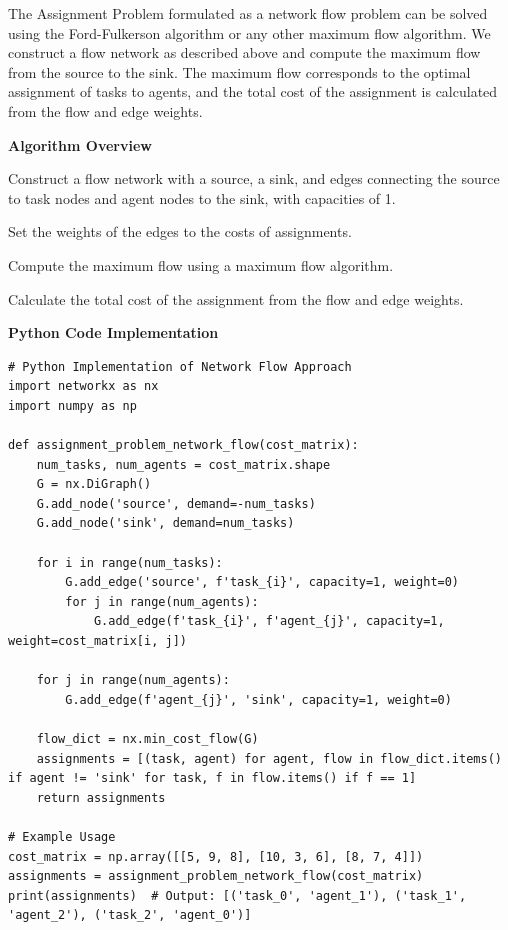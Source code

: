 \documentclass[12pt]{book} %
\begin{document}
The Assignment Problem formulated as a network flow problem can be solved using the Ford-Fulkerson algorithm or any other maximum flow algorithm. We construct a flow network as described above and compute the maximum flow from the source to the sink. The maximum flow corresponds to the optimal assignment of tasks to agents, and the total cost of the assignment is calculated from the flow and edge weights.

\textbf{Algorithm Overview}
\FloatBarrier
\begin{algorithm}
\caption{Assignment Problem - Network Flow Approach}
\begin{algorithmic}[1]
\item Construct a flow network with a source, a sink, and edges connecting the source to task nodes and agent nodes to the sink, with capacities of 1.
  \item Set the weights of the edges to the costs of assignments.
  \item Compute the maximum flow using a maximum flow algorithm.
  \item Calculate the total cost of the assignment from the flow and edge weights.
\end{algorithmic}
\end{algorithm}
\FloatBarrier
\textbf{Python Code Implementation}
\begin{lstlisting}
# Python Implementation of Network Flow Approach
import networkx as nx
import numpy as np

def assignment_problem_network_flow(cost_matrix):
    num_tasks, num_agents = cost_matrix.shape
    G = nx.DiGraph()
    G.add_node('source', demand=-num_tasks)
    G.add_node('sink', demand=num_tasks)
    
    for i in range(num_tasks):
        G.add_edge('source', f'task_{i}', capacity=1, weight=0)
        for j in range(num_agents):
            G.add_edge(f'task_{i}', f'agent_{j}', capacity=1, weight=cost_matrix[i, j])
    
    for j in range(num_agents):
        G.add_edge(f'agent_{j}', 'sink', capacity=1, weight=0)
    
    flow_dict = nx.min_cost_flow(G)
    assignments = [(task, agent) for agent, flow in flow_dict.items() if agent != 'sink' for task, f in flow.items() if f == 1]
    return assignments

# Example Usage
cost_matrix = np.array([[5, 9, 8], [10, 3, 6], [8, 7, 4]])
assignments = assignment_problem_network_flow(cost_matrix)
print(assignments)  # Output: [('task_0', 'agent_1'), ('task_1', 'agent_2'), ('task_2', 'agent_0')]
\end{lstlisting}
\FloatBarrier
\end{document}
